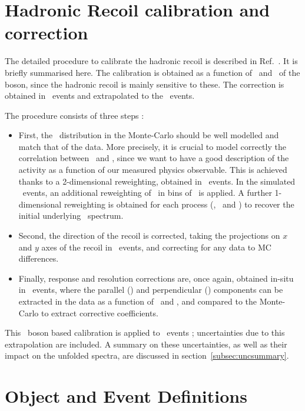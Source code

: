 \section{Hadronic Recoil calibration and correction}\label{sec:recoilCorr}

The detailed procedure to calibrate the hadronic recoil is described in Ref.~\cite{lowMuMw:INT1}. It is briefly summarised here. The calibration is obtained as a function of \setue\ and \ptv\ of the boson, since the hadronic recoil is mainly sensitive to these. The correction is obtained in \Zboson\ events and extrapolated to the \Wboson\ events.

The procedure consists of three steps :
\begin{itemize}
	\item First, the \setue\ distribution in the Monte-Carlo should be well modelled and match that of the data. More precisely, it is crucial to model correctly the correlation between \setue\ and \ptv, since we want to have a good description of the activity as a function of our measured physics observable. This is achieved thanks to a 2-dimensional reweighting, obtained in \Zboson\ events. In the simulated \Wboson\ events, an additional reweighting of \setue\ in bins of \ut\ is applied. A further 1-dimensional reweighting is obtained for each process (\Wminus, \Wplus\ and \Zboson) to recover the initial underlying \pttruth\ spectrum.

	\item Second, the direction of the recoil is corrected, taking the projections on $x$ and $y$ axes of the recoil in \Zboson\ events, and correcting for any data to MC differences.

	\item Finally, response and resolution corrections are, once again, obtained in-situ in \Zboson\ events, where the
    parallel (\upar) and perpendicular (\uperp) components can be extracted in the data as a function of \setue\ and \ptll, and compared
    to the Monte-Carlo to extract corrective coefficients. 
\end{itemize}

This \Zboson\ boson based calibration is applied to \Wboson\ events ; uncertainties due to this extrapolation are included. A summary on these uncertainties, as well as their impact on the unfolded spectra, are discussed in section~\ref{subsec:uncsummary}.

\section{Object and Event Definitions}
\label{subsec:definitions}

